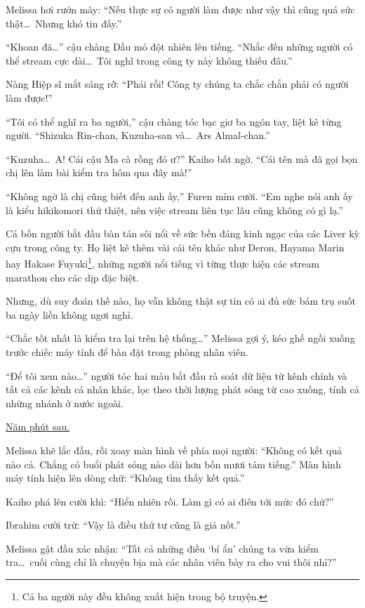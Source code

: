 \documentclass[../main.tex]{subfiles}
\begin{document}
Melissa hơi rướn mày: ``Nếu thực sự có người làm được như vậy thì cũng quá sức thật\dots\ Nhưng khó tin đấy.''

``Khoan đã\dots'' cậu chàng Dầu mỏ đột nhiên lên tiếng. ``Nhắc đến những người có thể stream cực dài\dots\ Tôi nghĩ trong công ty này không thiếu đâu.''

Nàng Hiệp sĩ mắt sáng rỡ: ``Phải rồi! Công ty chúng ta chắc chắn phải có người làm được!''

``Tôi có thể nghĩ ra ba người,'' cậu chàng tóc bạc giơ ba ngón tay, liệt kê từng người. ``Shizuka Rin-chan, Kuzuha-san và\dots\ Ars Almal-chan.''

``Kuzuha\dots\ A! Cái cậu Ma cà rồng đó ư?'' Kaiho bất ngờ. ``Cái tên mà đã gọi bọn chị lên làm bài kiểm tra hôm qua đây mà!''

``Không ngờ là chị cũng biết đến anh ấy,'' Furen mỉm cười. ``Em nghe nói anh ấy là kiểu hikikomori thứ thiệt, nên việc stream liên tục lâu cũng không có gì lạ.''

Cả bốn người bắt đầu bàn tán sôi nổi về sức bền đáng kinh ngạc của các Liver kỳ cựu trong công ty. Họ liệt kê thêm vài cái tên khác như Deron, Hayama Marin hay Hakase Fuyuki\footnote{Cả ba người này đều không xuất hiện trong bộ truyện.}, những người nổi tiếng vì từng thực hiện các stream marathon cho các dịp đặc biệt.

Nhưng, dù suy đoán thế nào, họ vẫn không thật sự tin có ai đủ sức bám trụ suốt ba ngày liền không ngơi nghỉ.

``Chắc tốt nhất là kiểm tra lại trên hệ thống\dots'' Melissa gợi ý, kéo ghế ngồi xuống trước chiếc máy tính để bàn đặt trong phòng nhân viên.

``Để tôi xem nào\dots'' người tóc hai màu bắt đầu rà soát dữ liệu từ kênh chính và tất cả các kênh cá nhân khác, lọc theo thời lượng phát sóng từ cao xuống, tính cả những nhánh ở nước ngoài.


\uline{Năm phút sau.}

Melissa khẽ lắc đầu, rồi xoay màn hình về phía mọi người:
``Không có kết quả nào cả. Chẳng có buổi phát sóng nào dài hơn bốn mươi tám tiếng.'' Màn hình máy tính hiện lên dòng chữ: ``Không tìm thấy kết quả.''

Kaiho phá lên cười khì: ``Hiển nhiên rồi. Làm gì có ai điên tới mức đó chứ?''

Ibrahim cười trừ: ``Vậy là điều thứ tư cũng là giả nốt.''

Melissa gật đầu xác nhận: ``Tất cả những điều `bí ẩn' chúng ta vừa kiểm tra\dots\ cuối cùng chỉ là chuyện bịa mà các nhân viên bày ra cho vui thôi nhỉ?''
\end{document}
